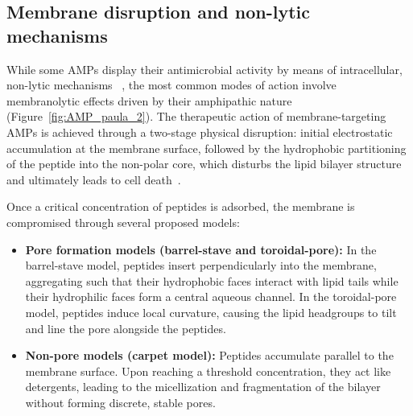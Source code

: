 \subsection{Membrane disruption and non-lytic mechanisms}

While some AMPs display their antimicrobial activity by means of intracellular, non-lytic mechanisms ~\cite{Scocchi2016}, the most common modes of action involve membranolytic effects driven by their amphipathic nature (Figure~\ref{fig:AMP_paula_2}). The therapeutic action of membrane-targeting AMPs is achieved through a two-stage physical disruption: initial electrostatic accumulation at the membrane surface, followed by the hydrophobic partitioning of the peptide into the non-polar core, which disturbs the lipid bilayer structure and ultimately leads to cell death~\cite{Mookherjee2020,BuiThiPhuong2024}. 

Once a critical concentration of peptides is adsorbed, the membrane is compromised through several proposed models:

\begin{itemize}
    \item \textbf{Pore formation models (barrel-stave and toroidal-pore):} In the barrel-stave model, peptides insert perpendicularly into the membrane, aggregating such that their hydrophobic faces interact with lipid tails while their hydrophilic faces form a central aqueous channel. In the toroidal-pore model, peptides induce local curvature, causing the lipid headgroups to tilt and line the pore alongside the peptides.
    \item \textbf{Non-pore models (carpet model):} Peptides accumulate parallel to the membrane surface. Upon reaching a threshold concentration, they act like detergents, leading to the micellization and fragmentation of the bilayer without forming discrete, stable pores.
\end{itemize}

\newpage

